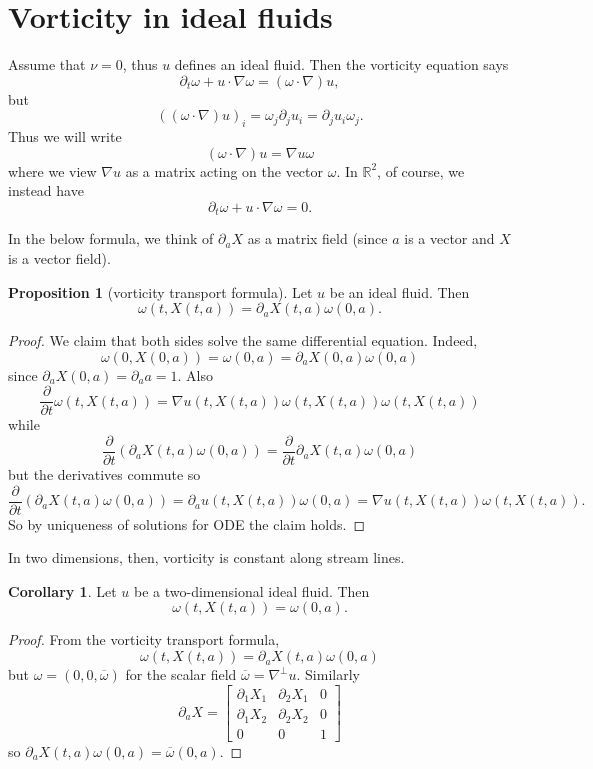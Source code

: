 \documentclass[12pt]{book}
\newcommand{\RR}{\mathbb{R}}
\theoremstyle{definition}
\newtheorem{proposition}[theorem]{Proposition}
\newtheorem{corollary}[theorem]{Corollary}
\begin{document}
\section{Vorticity in ideal fluids}
Assume that $\nu = 0$, thus $u$ defines an ideal fluid. Then the vorticity equation says
$$\partial_t \omega + u \cdot \nabla \omega = (\omega \cdot \nabla)u,$$
but
$$((\omega \cdot \nabla)u)_i = \omega_j \partial_j u_i = \partial_j u_i \omega_j.$$
Thus we will write
$$(\omega \cdot \nabla)u = \nabla u \omega$$
where we view $\nabla u$ as a matrix acting on the vector $\omega$. In $\RR^2$, of course, we instead have
$$\partial_t \omega + u \cdot \nabla \omega = 0.$$

In the below formula, we think of $\partial_a X$ as a matrix field (since $a$ is a vector and $X$ is a vector field).
\begin{proposition}[vorticity transport formula]
Let $u$ be an ideal fluid. Then
$$\omega(t, X(t, a)) = \partial_a X(t, a) \omega(0, a).$$
\end{proposition}
\begin{proof}
We claim that both sides solve the same differential equation. Indeed,
$$\omega(0, X(0, a)) = \omega(0, a) = \partial_a X(0, a) \omega(0, a)$$
since $\partial_a X(0, a) = \partial_a a = 1$.
Also
$$\frac{\partial}{\partial t} \omega(t, X(t, a)) = \nabla u(t, X(t, a))\omega(t, X(t, a)) \omega(t, X(t, a))$$
while
$$\frac{\partial}{\partial t}(\partial_a X(t, a) \omega(0, a)) = \frac{\partial}{\partial t} \partial_a X(t, a) \omega(0, a)$$
but the derivatives commute so
$$\frac{\partial}{\partial t}(\partial_a X(t, a) \omega(0, a)) = \partial_au(t, X(t, a)) \omega(0, a) = \nabla u(t, X(t, a)) \omega(t, X(t, a)).$$
So by uniqueness of solutions for ODE the claim holds.
\end{proof}

In two dimensions, then, vorticity is constant along stream lines.

\begin{corollary}
Let $u$ be a two-dimensional ideal fluid. Then
$$\omega(t, X(t, a)) = \omega(0, a).$$
\end{corollary}
\begin{proof}
From the vorticity transport formula,
$$\omega(t, X(t, a)) = \partial_a X(t, a) \omega(0, a)$$
but $\omega = (0, 0, \overline \omega)$ for the scalar field $\overline \omega = \nabla^\perp u$.
Similarly
$$\partial_a X = \begin{bmatrix}\partial_1 X_1 & \partial_2 X_1 & 0\\\partial_1 X_2 & \partial_2 X_2 & 0 \\ 0 & 0 & 1\end{bmatrix}$$
so $\partial_a X(t, a) \omega(0, a) = \overline \omega(0, a)$.
\end{proof}
\end{document}
